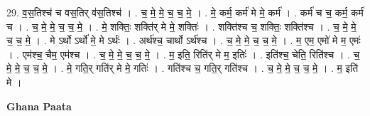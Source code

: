 \documentclass[17pt]{extarticle}
\begin{document}
29. व॒स॒तिश्च॑ च वस॒तिर् व॑स॒तिश्च॑ । . च॒ मे॒ मे॒ च॒ च॒ मे॒ । . मे॒ कर्म॒ कर्म॑ मे मे॒ कर्म॑ । . कर्म॑ च च॒ कर्म॒ कर्म॑ च । . च॒ मे॒ मे॒ च॒ च॒ मे॒ । . मे॒ शक्तिः॒ शक्ति॑र् मे मे॒ शक्तिः॑ । . शक्ति॑श्च च॒ शक्तिः॒ शक्ति॑श्च । . च॒ मे॒ मे॒ च॒ च॒ मे॒ । . मे ऽर्थो ऽर्थो॑ मे॒ मे ऽर्थः॑ । . अर्थ॑श्च॒ चार्थो ऽर्थ॑श्च । . च॒ मे॒ मे॒ च॒ च॒ मे॒ । . म॒ एम॒ एमो॑ मे म॒ एमः॑ । . एम॑श्च॒ चैम॒ एम॑श्च । . च॒ मे॒ मे॒ च॒ च॒ मे॒ । . म॒ इति॒ रिति॑र् मे म॒ इतिः॑ । . इति॑श्च॒ चेति॒ रिति॑श्च । . च॒ मे॒ मे॒ च॒ च॒ मे॒ । . मे॒ गति॒र् गति॑र् मे मे॒ गतिः॑ । . गति॑श्च च॒ गति॒र् गति॑श्च । . च॒ मे॒ मे॒ च॒ च॒ मे॒ । . म॒ इति॑ मे । \newline

\textbf{Ghana Paata } \newline
\end{document}
